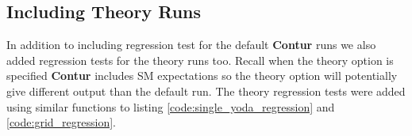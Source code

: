 \subsection{Including Theory Runs}
In addition to including regression test for the default \textbf{Contur} runs we also added regression tests for the theory runs too. Recall when the theory option is specified \textbf{Contur} includes SM expectations so the theory option will potentially give different output than the default run. The theory regression tests were added using similar functions to listing \ref{code:single_yoda_regression} and \ref{code:grid_regression}.


